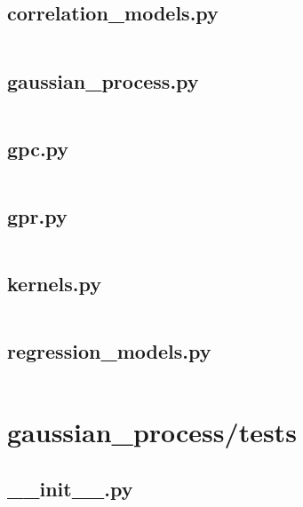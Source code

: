 \documentclass{article}
\begin{document}
\subsection{correlation\_models.py}
\inputminted{python}{/home/dufferzafar/dev/@clones/scikit-learn/sklearn/gaussian_process/correlation_models.py}
\newpage

\subsection{gaussian\_process.py}
\inputminted{python}{/home/dufferzafar/dev/@clones/scikit-learn/sklearn/gaussian_process/gaussian_process.py}
\newpage

\subsection{gpc.py}
\inputminted{python}{/home/dufferzafar/dev/@clones/scikit-learn/sklearn/gaussian_process/gpc.py}
\newpage

\subsection{gpr.py}
\inputminted{python}{/home/dufferzafar/dev/@clones/scikit-learn/sklearn/gaussian_process/gpr.py}
\newpage

\subsection{kernels.py}
\inputminted{python}{/home/dufferzafar/dev/@clones/scikit-learn/sklearn/gaussian_process/kernels.py}
\newpage

\subsection{regression\_models.py}
\inputminted{python}{/home/dufferzafar/dev/@clones/scikit-learn/sklearn/gaussian_process/regression_models.py}
\newpage

\section{gaussian\_process/tests}

\subsection{\_\_init\_\_.py}
\inputminted{python}{/home/dufferzafar/dev/@clones/scikit-learn/sklearn/gaussian_process/tests/__init__.py}
\newpage
\end{document}
